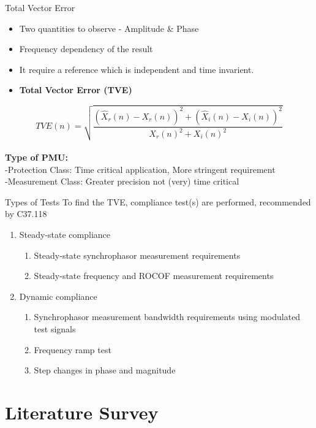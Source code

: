 \documentclass{beamer}
\begin{document}
   
   \begin{frame}{Total Vector Error}

	\begin{itemize}
	\item Two quantities to observe - Amplitude \& Phase
	\item Frequency dependency of the result
	\item It require a reference which is  independent and time invarient.
	\pause
	
	\item \textbf{Total Vector Error (TVE)} %
	\end{itemize}
	$$ TVE(n) = \sqrt{\frac{ (\hat{X}_r(n) - X_r(n))^2 + (\hat{X}_i(n)-X_i(n))^2} {X_r(n)^2 + X_i(n)^2}} $$ \\
\vspace{5pt}
\pause
 \textbf{Type of PMU:}\\
 -Protection  Class: Time critical application, More stringent requirement \\ 
 -Measurement Class: Greater precision not (very) time critical 
   \end{frame}
\begin{frame}{Types of Tests}
To find the TVE, compliance test(s) are performed, recommended by C37.118
\begin{enumerate}
\item Steady-state compliance
	\begin{enumerate}
	\item Steady-state synchrophasor measurement requirements
	\item Steady-state frequency and ROCOF measurement requirements
	\end{enumerate}
\item Dynamic compliance
	\begin{enumerate}
	\item Synchrophasor measurement bandwidth requirements using modulated test signals
	\item Frequency ramp test
	\item Step changes in phase and magnitude 
	\end{enumerate}
\end{enumerate} 

\end{frame}

\section{Literature Survey}
\end{document}
